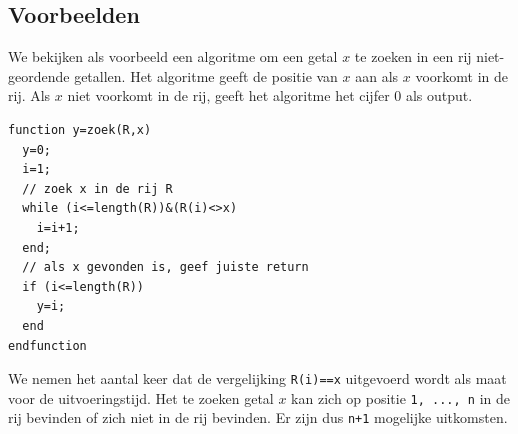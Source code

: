 \subsection{Voorbeelden}
\voorbeeld

We bekijken als voorbeeld een algoritme om een getal $x$ te zoeken in een rij niet-geordende getallen. Het algoritme geeft de positie van $x$ aan als $x$ voorkomt in de rij. Als $x$ niet voorkomt in de rij, geeft het algoritme het cijfer $0$ als output.

\begin{lstlisting}[caption={Algoritme: zoek getal $x$ in rij $R$}, label={lst:zoek}]
function y=zoek(R,x)
  y=0;
  i=1;
  // zoek x in de rij R
  while (i<=length(R))&(R(i)<>x)
    i=i+1;
  end;
  // als x gevonden is, geef juiste return
  if (i<=length(R))
    y=i;
  end
endfunction
\end{lstlisting}

We nemen het aantal keer dat de vergelijking \lstinline{R(i)==x} uitgevoerd wordt als maat voor de uitvoeringstijd. Het te zoeken getal $x$ kan zich op positie \lstinline{1, ..., n} in de rij bevinden of zich niet in de rij bevinden. Er zijn dus \lstinline{n+1} mogelijke uitkomsten.

